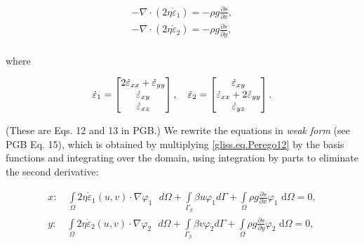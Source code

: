 \begin{equation}
  \label{gliss.eq.Perego12}
  \begin{split}
    -\nabla \cdot (2\eta {{{\dot{\varepsilon }}}_{1}}) = -\rho g\frac{\partial s}{\partial x}, \\
    -\nabla \cdot (2\eta {{{\dot{\varepsilon }}}_{2}}) = -\rho g\frac{\partial s}{\partial y}, \\
  \end{split}
\end{equation}

\noindent
where

\begin{equation}
  \label{gliss.eq.Perego13}
  {{{\dot{\varepsilon }}}_{1}}=\left[ \begin{matrix}
      2{{{\dot{\varepsilon }}}_{xx}}+{{{\dot{\varepsilon }}}_{yy}} \\ 
      {{{\dot{\varepsilon }}}_{xy}} \\ 
      {{{\dot{\varepsilon }}}_{xz}} \\ 
    \end{matrix} \right], \quad
  {{{\dot{\varepsilon }}}_{2}}=\left[ \begin{matrix}
      {{{\dot{\varepsilon }}}_{xy}} \\ 
      {{{\dot{\varepsilon }}}_{xx}}+2{{{\dot{\varepsilon }}}_{yy}} \\ 
      {{{\dot{\varepsilon }}}_{yz}} \\ 
    \end{matrix} \right].  \\
\end{equation}

\noindent
(These are Eqs. 12 and 13 in PGB.)  We rewrite the equations in \textit{weak form} (see PGB Eq. 15), which
is obtained by multiplying \eqref{gliss.eq.Perego12} by the basis functions and integrating over the domain, using 
integration by parts to eliminate the second derivative:

\begin{equation}
  \label{gliss.eq.weak_form}
  \begin{split}
    x: \quad \int\limits_{\Omega }{2\eta {{{\dot{\varepsilon }}}_{1}}(u,v)\cdot \nabla {{\varphi }_{1}}\text{ }d\Omega }+\int\limits_{{{\Gamma }_{\beta }}}{\beta u{{\varphi }_{1}}d\Gamma +\int\limits_{\Omega }{\rho g\frac{\partial s}{\partial x}}}{{\varphi }_{1}}\text{ d}\Omega =\text{0},  \\
    y: \quad \int\limits_{\Omega }{2\eta {{{\dot{\varepsilon }}}_{2}}(u,v)\cdot \nabla {{\varphi }_{2}}\text{ }d\Omega }+\int\limits_{{{\Gamma }_{\beta }}}{\beta v{{\varphi }_{2}}d\Gamma +\int\limits_{\Omega }{\rho g\frac{\partial s}{\partial y}}}{{\varphi }_{2}}\text{ d}\Omega =\text{0},  \\
  \end{split}
\end{equation}

